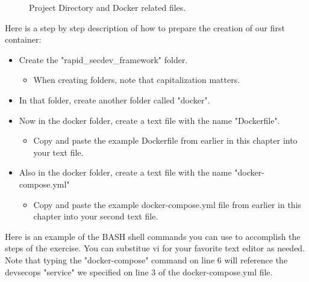 \begin{figure}
  \centering
  \caption{Project Directory and Docker related files.}
\end{figure}

\clearpage
\justify
Here is a step by step description of how to prepare the creation of our first container:

\begin{itemize}
  \item Create the "rapid\_secdev\_framework" folder.
        \begin{itemize}
          \item When creating folders, note that capitalization matters.
        \end{itemize}
  \item In that folder, create another folder called "docker".
  \item Now in the docker folder, create a text file with the name "Dockerfile".
        \begin{itemize}
          \item
                Copy and paste the example Dockerfile from earlier in this chapter
                into your text file.
        \end{itemize}
  \item Also in the docker folder, create a text file with the name "docker-compose.yml"
        \begin{itemize}
          \item Copy and paste the example docker-compose.yml file from earlier in this chapter into your second text file.
        \end{itemize}
\end{itemize}

\justify
Here is an example of the BASH shell commands you can use to accomplish
the steps of the exercise. You can substitue vi for your favorite text
editor as needed. Note that typing the "docker-compose" command on line
6 will reference the devsecops "service" we specified on line 3 of the
docker-compose.yml file.

